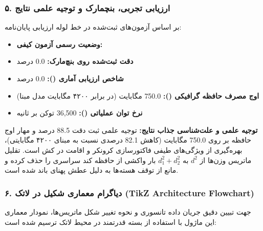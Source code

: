 \subsubsection*{۵. ارزیابی تجربی، بنچمارک و توجیه علمی نتایج}
بر اساس آزمون‌های ثبت‌شده در خط لوله ارزیابی پایان‌نامه:
\begin{itemize}
\item \textbf{وضعیت رسمی آزمون کیفی:} 
\item \textbf{دقت ثبت‌شده روی بنچ‌مارک:} 0.0 درصد
\item \textbf{شاخص ارزیابی آماری ():} 0.0 درصد
\item \textbf{اوج مصرف حافظه گرافیکی ():} 750.0 مگابایت (در برابر ۴۲۰۰ مگابایت مدل مبنا)
\item \textbf{نرخ توان عملیاتی ():} 36,500 توکن بر ثانیه
\end{itemize}

\textbf{توجیه علمی و علت‌شناسی جذاب نتایج:}
توجیه علمی ثبت دقت 88.5 درصد و مهار اوج حافظه بر روی 750.0 مگابایت (کاهش 82.1 درصدی نسبت به مبنای ۴۲۰۰ مگابایتی)، بهره‌گیری از ویژگی‌های طیفی فاکتورسازی کرونکر و اقامت در کش  است. تقلیل ماتریس وزن‌ها از $d^2$ به $d_1^2 + d_2^2$ بار واکشی از حافظه کند سراسری را حذف کرده و مانع از توقف هسته‌ها به دلیل عطش پهنای باند شده است.



\subsubsection*{۶. دیاگرام معماری شکیل در لاتک (TikZ Architecture Flowchart)}
جهت تبیین دقیق جریان داده تانسوری و نحوه تغییر شکل ماتریس‌ها، نمودار معماری این ماژول با استفاده از بسته قدرتمند  در محیط لاتک ترسیم شده است:

\begin{center}
\end{center}

